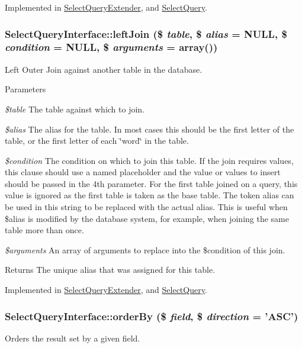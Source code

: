 Implemented in \hyperlink{classSelectQueryExtender_a6b9998d4e438ab3edc2867e32a5c120c}{SelectQueryExtender}, and \hyperlink{classSelectQuery_aceff7fc4040a74f693f2fc2548a99c17}{SelectQuery}.\hypertarget{interfaceSelectQueryInterface_ab3dcfdd428727d5a2f4890296807b27a}{
\subsubsection[{leftJoin}]{\setlength{\rightskip}{0pt plus 5cm}SelectQueryInterface::leftJoin (\$ {\em table}, \/  \$ {\em alias} = {\ttfamily NULL}, \/  \$ {\em condition} = {\ttfamily NULL}, \/  \$ {\em arguments} = {\ttfamily array()})}}
\label{interfaceSelectQueryInterface_ab3dcfdd428727d5a2f4890296807b27a}
Left Outer Join against another table in the database.


\begin{DoxyParams}{Parameters}
\item[{\em \$table}]The table against which to join. \item[{\em \$alias}]The alias for the table. In most cases this should be the first letter of the table, or the first letter of each \char`\"{}word\char`\"{} in the table. \item[{\em \$condition}]The condition on which to join this table. If the join requires values, this clause should use a named placeholder and the value or values to insert should be passed in the 4th parameter. For the first table joined on a query, this value is ignored as the first table is taken as the base table. The token alias can be used in this string to be replaced with the actual alias. This is useful when \$alias is modified by the database system, for example, when joining the same table more than once. \item[{\em \$arguments}]An array of arguments to replace into the \$condition of this join. \end{DoxyParams}
\begin{DoxyReturn}{Returns}
The unique alias that was assigned for this table. 
\end{DoxyReturn}


Implemented in \hyperlink{classSelectQueryExtender_aad9dd7062882479b2eb466fbe8dbd950}{SelectQueryExtender}, and \hyperlink{classSelectQuery_ab542a3bf62cfab85c8a4e0c3ac093d11}{SelectQuery}.\hypertarget{interfaceSelectQueryInterface_a80eca1c7bc37fca0468b6526a3f303e7}{
\subsubsection[{orderBy}]{\setlength{\rightskip}{0pt plus 5cm}SelectQueryInterface::orderBy (\$ {\em field}, \/  \$ {\em direction} = {\ttfamily 'ASC'})}}
\label{interfaceSelectQueryInterface_a80eca1c7bc37fca0468b6526a3f303e7}
Orders the result set by a given field.

